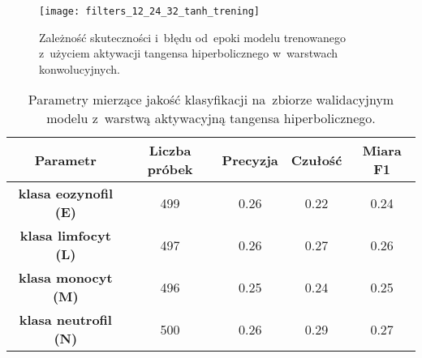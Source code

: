 {\begin{figure}[h!]
	\centering
	\centering
		\texttt{[image: filters\_12\_24\_32\_tanh\_trening]}	
	\caption{Zależność skuteczności i~błędu od~epoki modelu trenowanego z~użyciem aktywacji tangensa hiperbolicznego w~warstwach konwolucyjnych.}\label{fig:filters_12_24_32_tanh_trening}
\end{figure}

\begin{table}[h!]
\centering
\caption[Short Heading]{Parametry mierzące jakość klasyfikacji na~zbiorze walidacyjnym modelu z~warstwą aktywacyjną tangensa hiperbolicznego.}
\label{tab:tanh_act_layers_params_val}
\begin{tabular}{|c|c|c|c|c|}
\hline
\textbf{Parametr}                              & \textbf{Liczba próbek}  & \textbf{Precyzja} & \textbf{Czułość} & \textbf{Miara F1} \\ \hline
\textbf{klasa eozynofil (E)} & 499 & 0.26   & 0.22   & 0.24  \\ \hline
\textbf{klasa limfocyt (L)}& 497 & 0.26   & 0.27   & 0.26  \\ \hline
\textbf{klasa monocyt (M)}  & 496 & 0.25   & 0.24   & 0.25 \\ \hline
\textbf{klasa neutrofil (N)}& 500  & 0.26   & 0.29    & 0.27  \\ \hline
\end{tabular}
\end{table}

}